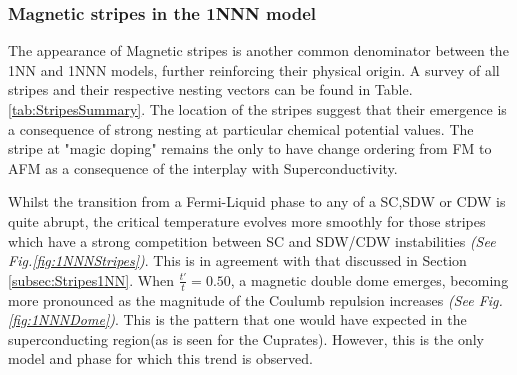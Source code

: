 \documentclass[12pt]{article}
\begin{document}
\subsubsection{Magnetic stripes in the 1NNN model}
\label{subsec:Stripes1NNN}

The appearance of Magnetic stripes is another common denominator between the 1NN and 1NNN models, further reinforcing their physical origin.
A survey of all stripes and their respective nesting vectors can be found in Table.\ref{tab:StripesSummary}. The location of the
stripes suggest that their emergence is a consequence of strong nesting at particular chemical potential values. 
The stripe at "magic doping" remains the only to have change ordering from FM to AFM as a consequence of the interplay with Superconductivity. 



\medskip 

\noindent Whilst the transition from a Fermi-Liquid phase to any of a SC,SDW or CDW is quite abrupt, the critical temperature
evolves more smoothly for those stripes which have a strong competition between SC and SDW/CDW instabilities \textit{(See Fig.\ref{fig:1NNNStripes})}. This is in agreement with
that discussed in Section \ref{subsec:Stripes1NN}. When $\frac{t'}{t} = 0.50$, a magnetic double dome emerges, becoming more pronounced as the 
magnitude of the Coulumb repulsion increases \textit{(See Fig.\ref{fig:1NNNDome})}. This is the pattern that one would have expected in
the superconducting region(as is seen for the Cuprates\cite{taillefer2010scattering}). However, this is the only 
model and phase for which this trend is observed. 
 
\end{document}
